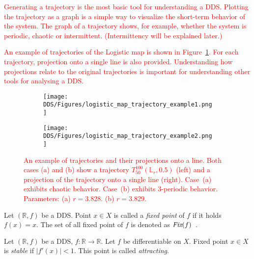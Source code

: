 \begin{remark}
    \textcolor{red}{
    Generating a trajectory is the most basic tool for understanding a DDS.
    Plotting the trajectory as a graph is a simple way to visualize the short-term behavior of the system.
    The graph of a trajectory shows, for example, whether the system is periodic, chaotic or intermittent. (Intermittency will be explained later.)
    }
    \par
    \textcolor{red}{
    An example of trajectories of the Logistic map is shown in Figure~\ref{fig:trajectory_example}.
    For each trajectory, projection onto a single line is also provided.
    Understanding how projections relate to the original trajectories is important for understanding other tools for analysing a DDS.
    }
\end{remark}

\begin{figure}[!h]
    \centering
    \begin{subfigure}{0.495\textwidth}
        \centering
        \texttt{[image: DDS/Figures/logistic\_map\_trajectory\_example1.png]}
        \caption{}
    \end{subfigure}
    \hfill
    \begin{subfigure}{0.495\textwidth}
        \centering
        \texttt{[image: DDS/Figures/logistic\_map\_trajectory\_example2.png]}
        \caption{}
    \end{subfigure}

    \caption{
        \textcolor{red}{ 
        An example of trajectories and their projections onto a line. 
        Both cases (a) and (b) show a trajectory $T_{50}^{100}(\mathbb{L}_{r}, 0.5)$ (left) and a projection of the trajectory onto a single line (right). 
        Case~(a) exhibits chaotic behavior.
        Case~(b) exhibits $3$-periodic behavior.
        Parameters: 
        (a) $r = 3.828$. 
        (b) $r = 3.829$. 
        }
    }
    \label{fig:trajectory_example}
\end{figure}

\label{def:fixed point}
\begin{definition}
    Let $\left( \mathbb{R}, f \right)$ be a DDS. Point $x \in X$ is called a \emph{fixed point} of $f$ if it holds $f(x) = x$.
    The set of all fixed point of $f$ is denoted as $\emph{Fix}(f)$~\cite{Devaney20211026}.
\end{definition}

\label{def:sfp}
\begin{definition}
    Let $\left(\mathbb{R}, f\right)$ be a DDS, $f:\mathbb{R} \rightarrow \mathbb{R}$. Let $f$ be differentiable on $X$. Fixed point $x \in X$ is \emph{stable} if $|f'(x)| < 1$.
    This point is called \emph{attracting}.
\end{definition}


